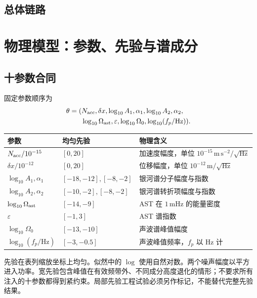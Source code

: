\documentclass[UTF8,fontset=none,a4paper,11pt]{ctexart}
\newcommand{\chapterpage}[1]{\section{#1}}
\begin{document}
\subsection{总体链路}
\begin{center}\end{center}
\chapterpage{物理模型：参数、先验与谱成分}
\subsection{十参数合同}
固定参数顺序为
\begin{align}
\theta=(&N_{\rm acc},\delta x,\log_{10}A_1,\alpha_1,
\log_{10}A_2,\alpha_2,\nonumber\\
&\log_{10}\Omega_{\mathrm{ast}},\varepsilon,\log_{10}\Omega_0,\log_{10}(f_p/\mathrm{Hz})).
\end{align}
\par\noindent
\begin{tabularx}{\linewidth}{p{38mm}p{38mm}Y}\toprule
参数 & 均匀先验 & 物理含义\\\midrule
$N_{\rm acc}/10^{-15}$ & $[0,20]$ & 加速度幅度，单位 $10^{-15}\,\mathrm{m\,s^{-2}/\sqrt{Hz}}$\\
$\delta x/10^{-12}$ & $[0,20]$ & 位移幅度，单位 $10^{-12}\,\mathrm{m/\sqrt{Hz}}$\\
$\log_{10}A_1,\alpha_1$ & $[-18,-12],[-8,-2]$ & 银河谱分子幅度与指数\\
$\log_{10}A_2,\alpha_2$ & $[-10,-2],[-8,-2]$ & 银河谱转折项幅度与指数\\
$\log_{10}\Omega_{\mathrm{ast}}$ & $[-14,-9]$ & AST 在 $1\,\mathrm{mHz}$ 的能量密度\\
$\varepsilon$ & $[-1,3]$ & AST 谱指数\\
$\log_{10}\Omega_0$ & $[-13,-10]$ & 声波谱峰值幅度\\
$\log_{10}(f_p/\mathrm{Hz})$ & $[-3,-0.5]$ & 声波峰值频率，$f_p$ 以 Hz 计\\\bottomrule
\end{tabularx}
\par 先验在表列缩放坐标上均匀。似然中的 $\log$ 使用自然对数。两个噪声幅度以平方进入功率。宽先验包含峰值在有效频带外、不同成分高度退化的情形；不要求所有注入的十参数都得到紧约束。局部先验工程试验必须另作标记，不能替代完整先验结果。
\end{document}
